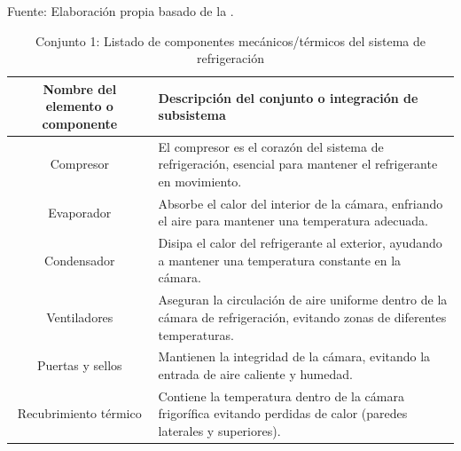 \begin{table}[H]
	\centering
	\caption{Conjunto 1: Listado de componentes mecánicos/térmicos del sistema de refrigeración}
	Fuente: Elaboración propia basado de la .
	\begin{tabular}{@{}cl@{}}
		\toprule
		\begin{minipage}[t]{0.25\linewidth}\textbf{Nombre del elemento o componente}\end{minipage} & \begin{minipage}[t]{0.7\linewidth}\textbf{Descripción del conjunto o integración de subsistema}\end{minipage} \\
		
		\midrule
		Compresor                                 & \begin{minipage}[t]{0.7\linewidth}El compresor es el corazón del sistema de refrigeración, esencial para mantener el refrigerante en movimiento.\end{minipage} \\
		Evaporador                                & \begin{minipage}[t]{0.7\linewidth}Absorbe el calor del interior de la cámara, enfriando el aire para mantener una temperatura adecuada.\end{minipage} \\
		Condensador                               & \begin{minipage}[t]{0.7\linewidth}Disipa el calor del refrigerante al exterior, ayudando a mantener una temperatura constante en la cámara.\end{minipage} \\
		Ventiladores                              & \begin{minipage}[t]{0.7\linewidth}Aseguran la circulación de aire uniforme dentro de la cámara de refrigeración, evitando zonas de diferentes temperaturas.\end{minipage} \\
		Puertas y sellos                          & \begin{minipage}[t]{0.7\linewidth}Mantienen la integridad de la cámara, evitando la entrada de aire caliente y humedad.\end{minipage} \\
		
		Recubrimiento térmico              
		
		
		& \begin{minipage}[t]{0.7\linewidth}
			Contiene la temperatura  	dentro de la cámara 		  	frigorífica evitando perdidas 		  	de calor (paredes laterales y superiores).
		\end{minipage} \\
		
		
		\bottomrule
	\end{tabular}
	\label{tabla:mecanicos}
	
\end{table}


